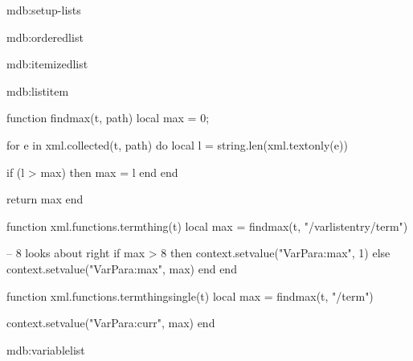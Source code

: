 
\startxmlsetups mdb:setup-lists

\stopxmlsetups


\startxmlsetups mdb:orderedlist
	\startitemize[n]
	\stopitemize
\stopxmlsetups

\startxmlsetups mdb:itemizedlist
	\startitemize[1]
	\stopitemize
\stopxmlsetups

\startxmlsetups mdb:listitem
	\item
\stopxmlsetups

\startluacode

function findmax(t, path)
	local max = 0;

	for e in xml.collected(t, path) do
		local l = string.len(xml.textonly(e))

		if (l > max) then
			max = l
		end
	end

	return max
end

function xml.functions.termthing(t)
	local max = findmax(t, "/varlistentry/term")

	-- 8 looks about right
	if max > 8 then
		context.setvalue("VarPara:max", 1)
	else
		context.setvalue("VarPara:max", max)
	end
end

function xml.functions.termthingsingle(t)
	local max = findmax(t, "/term")

	context.setvalue("VarPara:curr", max)
end

\stopluacode

\startxmlsetups mdb:variablelist


	\setupparagraphs[VarPara][1][width=\getvalue{VarPara:max}ex]
	\setupparagraphs[VarPara][2][width=]


